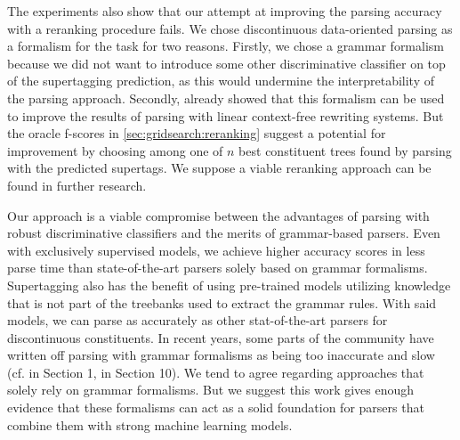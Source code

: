 \documentclass[../document.tex]{subfiles}
\begin{document}
    The experiments also show that our attempt at improving the parsing accuracy with a reranking procedure fails.
    We chose discontinuous data-oriented parsing as a formalism for the task for two reasons.
        Firstly, we chose a grammar formalism because we did not want to introduce some other discriminative classifier on top of the supertagging prediction, as this would undermine the interpretability of the parsing approach.
        Secondly, \citet{CraSchBod16} already showed that this formalism can be used to improve the results of parsing with linear context-free rewriting systems.
    But the oracle f-scores in \cref{sec:gridsearch:reranking} suggest a potential for improvement by choosing among one of \(n\) best constituent trees found by parsing with the predicted supertags.
    We suppose a viable reranking approach can be found in further research.

    Our approach is a viable compromise between the advantages of parsing with robust discriminative classifiers and the merits of grammar-based parsers.
    Even with exclusively supervised models, we achieve higher accuracy scores in less parse time than state-of-the-art parsers solely based on grammar formalisms.
    Supertagging also has the benefit of using pre-trained models utilizing knowledge that is not part of the treebanks used to extract the grammar rules.
    With said models, we can parse as accurately as other stat-of-the-art parsers for discontinuous constituents.
    In recent years, some parts of the  community have written off parsing with grammar formalisms as being too inaccurate and slow (cf. \citealp{StaSte20} in Section 1, \citealp{zhang2020survey} in Section 10).
    We tend to agree regarding approaches that solely rely on grammar formalisms.
    But we suggest this work gives enough evidence that these formalisms can act as a solid foundation for parsers that combine them with strong machine learning models.
\end{document}
